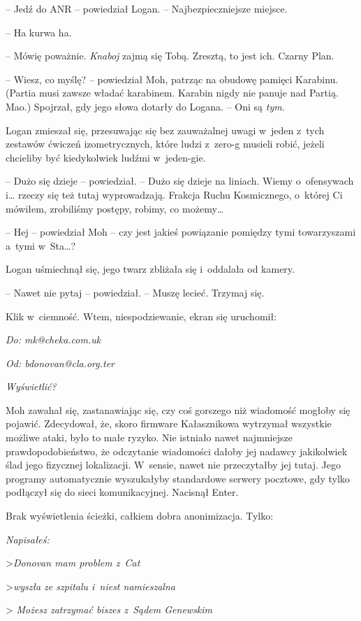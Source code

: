 \documentclass[oneside,polish,11pt,sfheadings]{mwbk}
\begin{document}
-- Jedź do ANR -- powiedział Logan. -- Najbezpieczniejsze miejsce.

-- Ha kurwa ha.

-- Mówię poważnie. \emph{Knaboj} zajmą się Tobą. Zresztą, to jest ich.
Czarny Plan.

-- Wiesz, co myślę? -- powiedział Moh, patrząc na obudowę pamięci
Karabinu. (Partia musi zawsze władać karabinem. Karabin nigdy nie panuje
nad Partią. Mao.) Spojrzał, gdy jego słowa dotarły do Logana. -- Oni są
\emph{tym}.

Logan zmieszał się, przesuwając się bez zauważalnej uwagi w~jeden z~tych
zestawów ćwiczeń izometrycznych, które ludzi z~zero-g musieli robić,
jeżeli chcieliby być kiedykolwiek ludźmi w~jeden-gie. 

-- Dużo się dzieje
-- powiedział. -- Dużo się dzieje na liniach. Wiemy o~ofensywach i\ldots
rzeczy się też tutaj wyprowadzają. Frakcja Ruchu Kosmicznego, o~której
Ci mówiłem, zrobiliśmy postępy, robimy, co możemy\ldots

-- Hej -- powiedział Moh -- czy jest jakieś powiązanie pomiędzy tymi
towarzyszami a~tymi w~Sta\ldots?

Logan uśmiechnął się, jego twarz zbliżała się i~oddalała od kamery.

-- Nawet nie pytaj -- powiedział. -- Muszę lecieć. Trzymaj się.

Klik w~ciemność. Wtem, niespodziewanie, ekran się uruchomił:

\emph{Do: mk@cheka.­com.­uk}

\emph{Od: bdonovan@cla.­org.­ter}

\emph{Wyświetlić?}

Moh zawahał się, zastanawiając się, czy coś gorszego niż wiadomość
mogłoby się pojawić. Zdecydował, że, skoro firmware Kałasznikowa
wytrzymał wszystkie możliwe ataki, było to małe ryzyko. Nie istniało
nawet najmniejsze prawdopodobieństwo, że odczytanie wiadomości dałoby jej
nadawcy jakikolwiek ślad jego fizycznej lokalizacji. W~sensie, nawet nie
przeczytałby jej tutaj. Jego programy automatycznie wyszukałyby
standardowe serwery pocztowe, gdy tylko podłączył się do sieci
komunikacyjnej. Nacisnął Enter.

Brak wyświetlenia ścieżki, całkiem dobra anonimizacja. Tylko:

\emph{Napisałeś:}

>\emph{Donovan mam problem z~Cat}


>\emph{wyszła ze szpitalu i~niest namieszalna}

>
\emph{Możesz zatrzymać biszes z~Sądem Genewskim}
\end{document}
